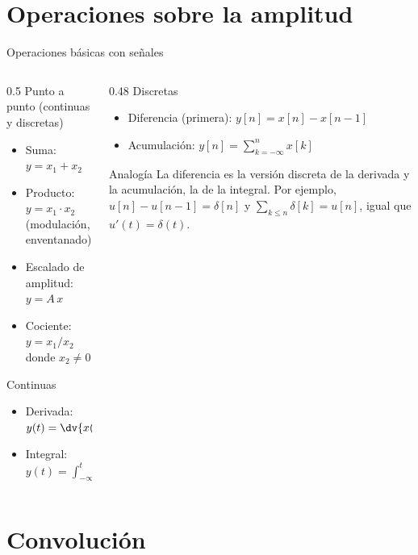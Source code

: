 \documentclass[aspectratio=169,11pt]{beamer}
\begin{document}
\section{Operaciones sobre la amplitud}

\begin{frame}{Operaciones básicas con señales}
  \begin{columns}[T]
    \begin{column}{0.5\textwidth}
      \alert{Punto a punto} (continuas y discretas)
      \begin{itemize}\small
        \item Suma: $y=x_1+x_2$
        \item Producto: $y=x_1\cdot x_2$ (modulación, enventanado)
        \item Escalado de amplitud: $y=A\,x$
        \item Cociente: $y=x_1/x_2$ donde $x_2\neq0$
      \end{itemize}
      \medskip
      \alert{Continuas}
      \begin{itemize}\small
        \item Derivada: $y(t)=\dv{x(t)}{t}$
        \item Integral: $y(t)=\displaystyle\int_{-\infty}^{t}x(\tau)\dd\tau$
      \end{itemize}
    \end{column}
    \begin{column}{0.48\textwidth}
      \alert{Discretas}
      \begin{itemize}\small
        \item Diferencia (primera): $y[n]=x[n]-x[n-1]$
        \item Acumulación: $y[n]=\displaystyle\sum_{k=-\infty}^{n}x[k]$
      \end{itemize}
      \begin{block}{Analogía}
        \small
        La diferencia es la versión discreta de la derivada y la acumulación, la de la integral. Por ejemplo,
        $u[n]-u[n-1]=\delta[n]$ y $\sum_{k\le n}\delta[k]=u[n]$, igual que $u'(t)=\delta(t)$.
      \end{block}
    \end{column}
  \end{columns}
\end{frame}

\section{Convolución}
\end{document}
